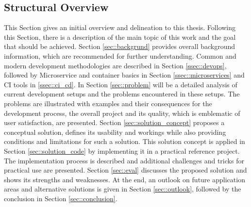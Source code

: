 \documentclass[12pt, a4paper]{article}
\begin{document}
    \subsection{Structural Overview}
    This Section gives an initial overview and delineation to this thesis. Following this Section, there is a description of the main topic of this work and the goal that should be achieved. Section \ref{sec::backgrund} provides overall background information, which are recommended for further understanding. Common and modern development methodologies are described in Section \ref{ssec::devops}, followed by Microservice and container basics in Section \ref{ssec::microservices} and \acl{CI} tools in \ref{ssec::ci_cd}. In Section \ref{sec::problem} will be a detailed analysis of current development setups and the problems encountered in these setups. The problems are illustrated with examples and their consequences for the development process, the overall project and its quality, which is emblematic of user satisfaction, are presented. Section \ref{sec::solution_concept} proposes a conceptual solution, defines its usability and workings while also providing conditions and limitations for such a solution. This solution concept is applied in Section \ref{sec::solution_code} by implementing it in a practical reference project. The implementation process is described and additional challenges and tricks for practical use are presented. Section \ref{sec::eval} discusses the proposed solution and shows its strengths and weaknesses. At the end, an outlook on future application areas and alternative solutions is given in Section \ref{sec::outlook}, followed by the conclusion in Section \ref{sec::conclusion}.
\end{document}
